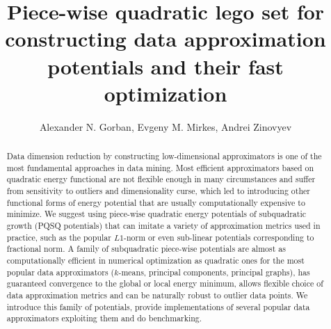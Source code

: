 \documentclass[preprint,12pt]{elsarticle}
\begin{document}
\begin{frontmatter}



\title{Piece-wise quadratic lego set for constructing data approximation potentials and their fast optimization}


\author{Alexander N. Gorban, Evgeny M. Mirkes, Andrei Zinovyev}

\address{Leicester, Paris}

\begin{abstract}
Data dimension reduction by constructing low-dimensional approximators is one of the most fundamental approaches in data mining.
Most efficient approximators based on quadratic energy functional are not flexible enough in many circumstances and suffer from sensitivity to outliers
and dimensionality curse, which led to introducing other functional forms of energy potential that are usually computationally expensive to minimize.
We suggest using piece-wise quadratic energy potentials of subquadratic growth (PQSQ potentials) that can imitate a variety
of approximation metrics used in practice, such as the popular $L1$-norm or even sub-linear potentials corresponding to fractional norm.
A family of subquadratic piece-wise potentials are almost as computationally
efficient in numerical optimization as quadratic ones for the most popular data approximators ($k$-means, principal components, principal graphs),
has guaranteed convergence to the global or local energy minimum, allows flexible choice of data approximation metrics and can be naturally
robust to outlier data points. We introduce this family of potentials, provide implementations of several popular data approximators
exploiting them and do benchmarking.
\end{abstract}


\end{frontmatter}
\end{document}
